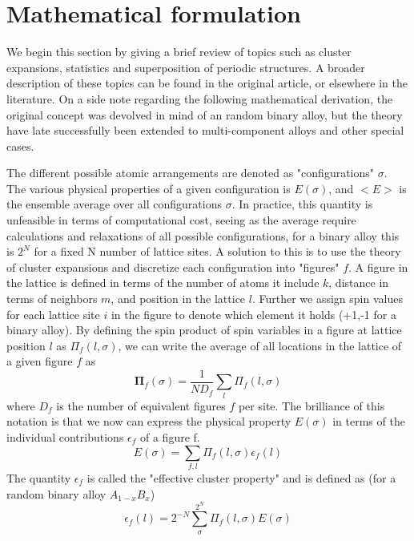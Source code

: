 \section{Mathematical formulation}
We begin this section by giving a brief review of topics such as cluster expansions, statistics and superposition of periodic structures. A broader description of these topics can be found in the original article, or elsewhere in the literature. On a side note regarding the following mathematical derivation, the original concept was devolved in mind of an random binary alloy, but the theory have late successfully been extended to multi-component alloys and other special cases. 

The different possible atomic arrangements are denoted as "configurations" $\sigma$. The various physical properties of a given configuration is $E(\sigma)$, and $<E>$ is the ensemble average over all configurations $\sigma$. In practice, this quantity is unfeasible in terms of computational cost, seeing as the average require calculations and relaxations of all possible configurations, for a binary alloy this is $2^N$ for a fixed N number of lattice sites. A solution to this is to use the theory of cluster expansions and discretize each configuration into "figures" $f$. A figure in the lattice is defined in terms of the number of atoms it include $k$, distance in terms of neighbors $m$, and position in the lattice $l$. Further we assign spin values for each lattice site $i$ in the figure to denote which element it holds (+1,-1 for a binary alloy). By defining the spin product of spin variables in a figure at lattice position $l$ as $\Pi_f(l, \sigma)$, we can write the average of all locations in the lattice of a given figure $f$ as 
\begin{equation}
    \boldsymbol{\Pi}_f(\sigma) = \frac{1}{ND_f} \sum_l \Pi_f (l,\sigma)
\end{equation}
where $D_f$ is the number of equivalent figures $f$ per site. The brilliance of this notation is that we now can express the physical property $E(\sigma)$ in terms of the individual contributions $\epsilon_f$ of a figure f.
\begin{equation}
    E(\sigma) = \sum_{f,l} \Pi_f(l, \sigma) \epsilon_f(l)
\end{equation}
The quantity $\epsilon_f$ is called the "effective cluster property" and is defined as (for a random binary alloy $A_{1-x}B_x$)
\begin{equation}
    \epsilon_f(l) = 2^{-N}\sum_\sigma^{2^N} \Pi_f (l,\sigma) E(\sigma)
\end{equation}
